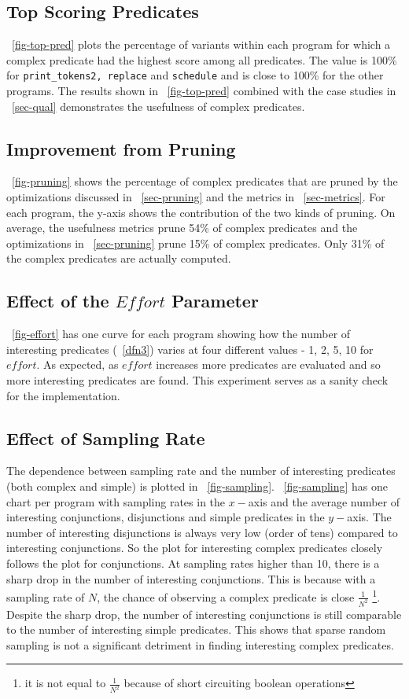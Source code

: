 \subsection{Top Scoring Predicates}
~\autoref{fig-top-pred} plots the percentage of variants within each program for which a complex predicate had the highest score among all predicates.  The value is 100\% for \texttt{print\_tokens2, replace} and \texttt{schedule} and is close to 100\% for the other programs.  The results shown in ~\autoref{fig-top-pred} combined with the case studies in ~\autoref{sec-qual} demonstrates the usefulness of complex predicates.

\subsection{Improvement from Pruning}
~\autoref{fig-pruning} shows the percentage of complex predicates that are pruned by the optimizations discussed in ~\autoref{sec-pruning} and the metrics in ~\autoref{sec-metrics}.  For each program, the y-axis shows the contribution of the two kinds of pruning.  On average, the usefulness metrics prune 54\% of complex predicates and the optimizations in ~\autoref{sec-pruning} prune 15\% of complex predicates.  Only 31\% of the complex predicates are actually computed.

\subsection{Effect of the $Effort$ Parameter}
~\autoref{fig-effort} has one curve for each program showing how the number of interesting predicates (~\autoref{dfn3}) varies at four different values - 1, 2, 5, 10 for $effort$.  As expected, as $effort$ increases more predicates are evaluated and so more interesting predicates are found.  This experiment serves as a sanity check for the implementation.

\subsection{Effect of Sampling Rate}
\label{sec-sampling}
The dependence between sampling rate and the number of interesting predicates (both complex and simple) is plotted in ~\autoref{fig-sampling}.  ~\autoref{fig-sampling} has one chart per program with sampling rates in the $x-$axis and the average number of interesting conjunctions, disjunctions and simple predicates in the $y-$axis.  The number of interesting disjunctions is always very low (order of tens) compared to interesting conjunctions.  So the plot for interesting complex predicates closely follows the plot for conjunctions.  At sampling rates higher than 10, there is a sharp drop in the number of interesting conjunctions.  This is because with a sampling rate of $N$, the chance of observing a complex predicate is close $\frac{1}{N^2}$ {\footnote{it is not equal to $\frac{1}{N^2}$ because of short circuiting boolean operations}}.  Despite the sharp drop, the number of interesting conjunctions is still comparable to the number of interesting simple predicates.  This shows that sparse random sampling is not a significant detriment in finding interesting complex predicates.


